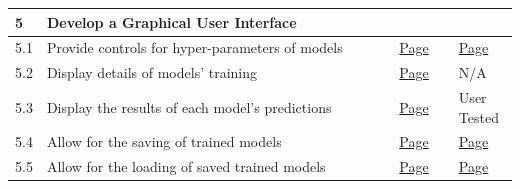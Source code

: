 \documentclass[./project-report/src/latex/project-report.tex]{subfiles}
\begin{document}
\begin{tabular}{|p{0.03\linewidth}|p{0.73\linewidth}|p{0.12\linewidth}|p{0.12\linewidth}|}
      \hline
      5 & Develop a Graphical User Interface & & \\
      \hline
      5.1 & Provide controls for hyper-parameters of models & \hyperref[sec:create_model-module]{Page \pageref{sec:create_model-module}} & \hyperref[sec:hyper-parameter-frame-input-validation]{Page \pageref{sec:hyper-parameter-frame-input-validation}} \\  %
      \hline
      5.2 & Display details of models' training & \hyperref[sec:create_model-module]{Page \pageref{sec:create_model-module}} & N/A \\
      \hline
      5.3 & Display the results of each model's predictions & \hyperref[sec:test_model-module]{Page \pageref{sec:test_model-module}} & User Tested \\
      \hline
      5.4 & Allow for the saving of trained models & \hyperref[sec:test_model-module]{Page \pageref{sec:test_model-module}} & \hyperref[sec:test-frames-input-validation]{Page \pageref{sec:test-frames-input-validation}} \\
      \hline
      5.5 & Allow for the loading of saved trained models & \hyperref[sec:load_model-module]{Page \pageref{sec:load_model-module}} & \hyperref[sec:load-model-frame-input-validation]{Page \pageref{sec:load-model-frame-input-validation}} \\
      \hline
\end{tabular}

\pagebreak
\end{document}
